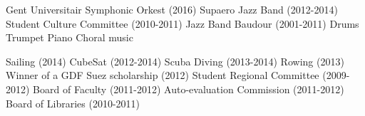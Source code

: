 \documentclass[a4paper]{deedy-resume} %
\begin{document}
\location{}
\vspace{3pt}
Gent Universitair Symphonic Orkest (2016) \textbullet{} Supaero Jazz Band (2012-2014) \textbullet{} Student Culture Committee (2010-2011) \textbullet{} Jazz Band Baudour (2001-2011) \textbullet{} Drums \textbullet{} Trumpet \textbullet{} Piano \textbullet{} Choral music

\vspace{12pt}


\location{}
\vspace{3pt}
Sailing (2014) \textbullet{} CubeSat (2012-2014) \textbullet{} Scuba Diving (2013-2014) \textbullet{} Rowing (2013) \textbullet{} Winner of a GDF Suez scholarship (2012) \textbullet{}  Student Regional Committee (2009-2012) \textbullet{} Board of Faculty (2011-2012)  \textbullet{} Auto-evaluation Commission (2011-2012) \textbullet{} Board of Libraries (2010-2011)


\sectionspace %
\vspace{10pt}

\end{document}

